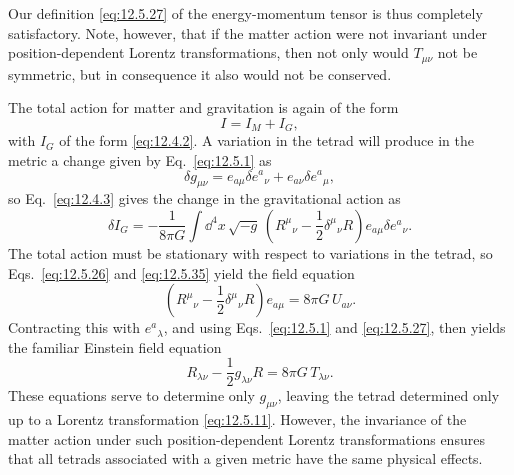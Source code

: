 Our definition \eqref{eq:12.5.27} of the energy-momentum tensor is thus
completely satisfactory. Note, however, that if the matter action were not
invariant under position-dependent Lorentz transformations, then not only
would \(T_{\mu\nu}\) not be symmetric, but in consequence it also would not
be conserved.

The total action for matter and gravitation is again of the form
\[
  I=I_M+I_G,
\]
with \(I_G\) of the form \eqref{eq:12.4.2}. A variation in the tetrad will
produce in the metric a change given by Eq.~\eqref{eq:12.5.1} as
\[
  \delta g_{\mu\nu}
  =
  e_{a\mu}\delta e^a{}_\nu
  +e_{a\nu}\delta e^a{}_\mu,
\]
so Eq.~\eqref{eq:12.4.3} gives the change in the gravitational action as
\begin{equation}
  \delta I_G
  =
  -\frac1{8\pi G}\int\dd^4x\,\sqrt{-g}\,
  \left(R^\mu{}_\nu-\frac12\delta^\mu{}_\nu R\right)
  e_{a\mu}\delta e^a{}_\nu.
  \tag{12.5.35}\label{eq:12.5.35}
\end{equation}
The total action must be stationary with respect to variations in the tetrad,
so Eqs.~\eqref{eq:12.5.26} and \eqref{eq:12.5.35} yield the field equation
\[
  \left(R^\mu{}_\nu-\frac12\delta^\mu{}_\nu R\right)e_{a\mu}
  =
  8\pi G\,U_{a\nu}.
\]
Contracting this with \(e^a{}_\lambda\), and using
Eqs.~\eqref{eq:12.5.1} and \eqref{eq:12.5.27}, then yields the familiar
Einstein field equation
\begin{equation}
  R_{\lambda\nu}-\frac12g_{\lambda\nu}R
  =
  8\pi G\,T_{\lambda\nu}.
  \tag{12.5.36}\label{eq:12.5.36}
\end{equation}
These equations serve to determine only \(g_{\mu\nu}\), leaving the tetrad
determined only up to a Lorentz transformation \eqref{eq:12.5.11}. However,
the invariance of the matter action under such position-dependent Lorentz
transformations ensures that all tetrads associated with a given metric have
the same physical effects.
